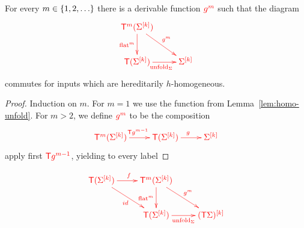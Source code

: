 \begin{lemma}
    For every $m \in \{1,2,\ldots\}$ there  is a derivable function ${\color{red}{g^m}}$ such that the  diagram  
\begin{align*}
    \ranked{
        \xymatrix{
            \tmonadn m  (\rSigma^{[k]}) \ar[d]_{\flatn m} \ar[dr]^{g^m}\\
            \tmonad (\rSigma^{[k]})  \ar[r]_{\unfold_\rSigma} &  \rSigma^{[k]}
        }
    }
\end{align*}
commutes for inputs  which are hereditarily $h$-homogeneous.
\end{lemma}
\begin{proof}
Induction on $m$. For $m=1$ we use the function from Lemma~\ref{lem:homo-unfold}. For $m >2$, we define  ${\color{red}{g^m}}$ to be the composition
\begin{align*}
    \ranked{
        \xymatrix{
            \tmonad^m (\rSigma^{[k]}) \ar[r]^{\tmonad g^{m-1}} & 
            \tmonad (\rSigma^{[k]}) \ar[r]^g & 
            \rSigma^{[k]}
            } 
    }
\end{align*}
apply first  ${\color{red}{\mathsf T}} {\color{red}{g^{m-1}}}$, yielding  to every label 
\end{proof}

\begin{align*}
    \ranked{
        \xymatrix{ \tmonad (\rSigma^{[k]}) \ar[r]^f \ar[rd]_{id}&
            \tmonadn m  (\rSigma^{[k]}) \ar[d]_{\flatn m} \ar[dr]^{g^m}\\ & 
            \tmonad (\rSigma^{[k]})  \ar[r]_{\unfold_\rSigma} & (\tmonad \rSigma)^{[k]}
        }
    }
\end{align*}
